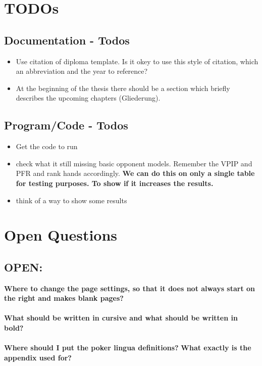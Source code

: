 



\newpage

\chapter{TODOs}
\section{Documentation - Todos}
\begin{itemize}
\item Use citation of diploma template. Is it okey to use this style of citation, which an abbreviation and the year to reference?
\item At the beginning of the thesis there should be a section which briefly describes the upcoming chapters (Gliederung).
\end{itemize}
\section{Program/Code - Todos}
\begin{itemize}
\item Get the code to run
\item check what it still missing
\subitem basic opponent models. Remember the VPIP and PFR and rank hands accordingly. \textbf{We can do this on only a single table for testing purposes. To show if it increases the results.}
\item think of a way to show some results
\end{itemize}
\chapter{Open Questions}
\section{OPEN:}
\textbf{Where to change the page settings, so that it does not always start on the right and makes blank pages?}\\\\
\textbf{What should be written in cursive and what should be written in bold?}\\\\
\textbf{Where should I put the poker lingua definitions?}
\textbf{What exactly is the appendix used for?}

